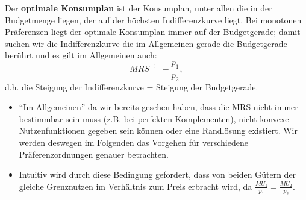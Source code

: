 Der \textbf{optimale Konsumplan} ist der Konsumplan, unter allen die in der Budgetmenge liegen, der auf der höchsten Indifferenzkurve liegt. Bei monotonen Präferenzen liegt der optimale Konsumplan immer auf der Budgetgerade; damit suchen wir die Indifferenzkurve die im Allgemeinen gerade die Budgetgerade berührt und es gilt im Allgemeinen auch:
		$$ MRS \overset{!}{=} - \frac{p_1}{p_2}, $$
d.h. die Steigung der Indifferenzkurve = Steigung der Budgetgerade.
\begin{itemize}
	\item \enquote{Im Allgemeinen} da wir bereits gesehen haben, dass die MRS nicht immer bestimmbar sein muss (z.B. bei perfekten Komplementen), nicht-konvexe Nutzenfunktionen gegeben sein können oder eine Randlösung existiert. Wir werden deswegen im Folgenden das Vorgehen für verschiedene Präferenzordnungen genauer betrachten.
	\item Intuitiv wird durch diese Bedingung gefordert, dass von beiden Gütern der gleiche Grenznutzen im Verhältnis zum Preis erbracht wird, da $\frac{MU_1}{p_1} = \frac{MU_2}{p_2}$.
\end{itemize}

